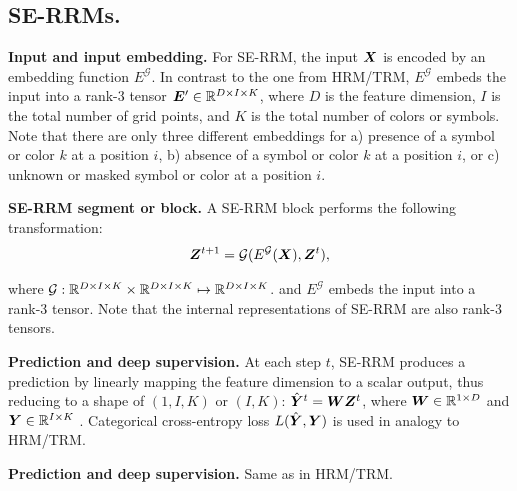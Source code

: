 \documentclass{article}
\theoremstyle{plain}
\theoremstyle{definition}
\theoremstyle{remark}
\renewcommand{\paragraph}[1]{\textbf{#1}\;}
\begin{document}
\subsection{SE-RRMs.}
\paragraph{Input and input embedding.}
For SE-RRM, the input $\bm{X}$ is 
encoded by an embedding function $E^{\mathcal G}$.
In contrast to the one from HRM/TRM, $E^{\mathcal G}$ embeds
the input into a rank-3 tensor
$\bm{E}' \in \mathbb{R}^{D \times I \times K}$, 
where $D$ is the feature dimension, $I$
is the total number of grid points, and $K$
is the total number of colors or symbols.
Note that there are only three different
embeddings for 
a) presence of a symbol or color $k$
at a position $i$,
b) absence of a symbol or color $k$
at a position $i$, or 
c) unknown or masked symbol or color 
at a position $i$.




\paragraph{SE-RRM segment or block.}
A SE-RRM block performs the following transformation:
\begin{align}
\bm{Z}^{t+1} = \mathcal G(E^{\mathcal G}(\bm{X}), \bm{Z}^t),
\end{align}

where $\mathcal G: \mathbb{R}^{D \times I \times K} \times
\mathbb{R}^{D \times I \times K} \mapsto \mathbb{R}^{D \times I \times K}$.
and $E^{\mathcal G}$ embeds the input 
into a rank-3 tensor. Note that
the internal representations of SE-RRM are
also rank-3 tensors. 

\paragraph{Prediction and deep supervision. }
At each step $t$, SE-RRM produces a 
prediction by linearly mapping 
the feature dimension to a scalar output, thus 
reducing to a shape of $(1,I,K)$ or $(I,K)$:
$\hat {\bm{Y}}^t=\bm{W} \bm{Z}^t$, where 
$\bm{W} \in \mathbb{R}^{1 \times D}$ and $\bm{Y} \in \mathbb{R}^{I \times K}$ .
Categorical cross-entropy loss $L(\hat {\bm{Y}}, \bm{Y})$ 
is used in analogy to HRM/TRM. 

\paragraph{Prediction and deep supervision.}
Same as in HRM/TRM.
\end{document}
